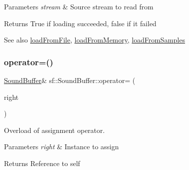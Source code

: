 \begin{DoxyParams}{Parameters}
{\em stream} & Source stream to read from\\
\hline
\end{DoxyParams}
\begin{DoxyReturn}{Returns}
True if loading succeeded, false if it failed
\end{DoxyReturn}
\begin{DoxySeeAlso}{See also}
\mbox{\hyperlink{classsf_1_1_sound_buffer_a2be6a8025c97eb622a7dff6cf2594394}{load\+From\+File}}, \mbox{\hyperlink{classsf_1_1_sound_buffer_af8cfa5599739a7edae69c5cba273d33f}{load\+From\+Memory}}, \mbox{\hyperlink{classsf_1_1_sound_buffer_a42d51ce4bb3b60c7ea06f63c273fd063}{load\+From\+Samples}} \begin{DoxyVerb}\end{DoxyVerb}
 
\end{DoxySeeAlso}
\mbox{\label{classsf_1_1_sound_buffer_adcc786b60bbd95be1551368fafd274a7}} 
\subsubsection{\texorpdfstring{operator=()}{operator=()}}
{\footnotesize\ttfamily \mbox{\hyperlink{classsf_1_1_sound_buffer}{Sound\+Buffer}}\& sf\+::\+Sound\+Buffer\+::operator= (\begin{DoxyParamCaption}\item[{const \mbox{\hyperlink{classsf_1_1_sound_buffer}{Sound\+Buffer}} \&}]{right }\end{DoxyParamCaption})}



Overload of assignment operator. 


\begin{DoxyParams}{Parameters}
{\em right} & Instance to assign\\
\hline
\end{DoxyParams}
\begin{DoxyReturn}{Returns}
Reference to self \begin{DoxyVerb}\end{DoxyVerb}
 
\end{DoxyReturn}
\mbox{\label{classsf_1_1_sound_buffer_aade64260c6375580a085314a30be007e}} 
